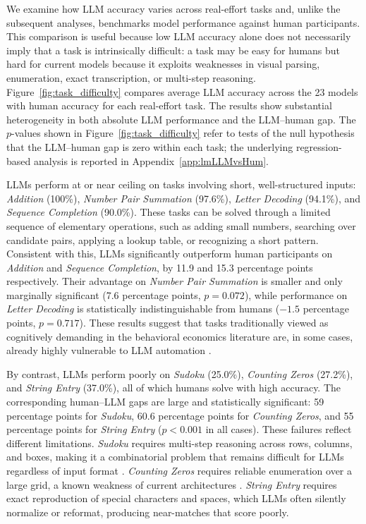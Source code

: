 \documentclass[12pt,a4paper]{article}
\begin{document}
\color{black}
\noindent
We examine how LLM accuracy varies across real-effort tasks and, unlike the subsequent analyses, benchmarks model performance against human participants. 
This comparison is useful because low LLM accuracy alone does not necessarily imply that a task is intrinsically difficult: a task may be easy for humans but hard for current models because it exploits weaknesses in visual parsing, enumeration, exact transcription, or multi-step reasoning.
Figure~\ref{fig:task_difficulty} compares average LLM accuracy across the 23 models with human accuracy for each real-effort task. The results show substantial heterogeneity in both absolute LLM performance and the LLM--human gap. 
The $p$-values shown in Figure~\ref{fig:task_difficulty} refer to tests of the null hypothesis that the LLM--human gap is zero within each task; the underlying regression-based analysis is reported in Appendix~\ref{app:lmLLMvsHum}.

LLMs perform at or near ceiling on tasks involving short, well-structured inputs: \emph{Addition} (100\%), \emph{Number Pair Summation} (97.6\%), \emph{Letter Decoding} (94.1\%), and \emph{Sequence Completion} (90.0\%). These tasks can be solved through a limited sequence of elementary operations, such as adding small numbers, searching over candidate pairs, applying a lookup table, or recognizing a short pattern. Consistent with this, LLMs significantly outperform human participants on \emph{Addition} and \emph{Sequence Completion}, by 11.9 and 15.3 percentage points respectively. Their advantage on \emph{Number Pair Summation} is smaller and only marginally significant (7.6 percentage points, $p=0.072$), while performance on \emph{Letter Decoding} is statistically indistinguishable from humans ($-1.5$ percentage points, $p=0.717$). These results suggest that tasks traditionally viewed as cognitively demanding in the behavioral economics literature are, in some cases, already highly vulnerable to LLM automation \citep{nogueira2021investigating, wei2022chain}.

By contrast, LLMs perform poorly on \emph{Sudoku} (25.0\%), \emph{Counting Zeros} (27.2\%), and \emph{String Entry} (37.0\%), all of which humans solve with high accuracy. The corresponding human--LLM gaps are large and statistically significant: 59 percentage points for \emph{Sudoku}, 60.6 percentage points for \emph{Counting Zeros}, and 55 percentage points for \emph{String Entry} ($p<0.001$ in all cases). These failures reflect different limitations. \emph{Sudoku} requires multi-step reasoning across rows, columns, and boxes, making it a combinatorial problem that remains difficult for LLMs regardless of input format \citep{maiya2025sudoku}. \emph{Counting Zeros} requires reliable enumeration over a large grid, a known weakness of current architectures \citep{yehudai2024counting, butoi2024counting}. \emph{String Entry} requires exact reproduction of special characters and spaces, which LLMs often silently normalize or reformat, producing near-matches that score poorly.
\end{document}
